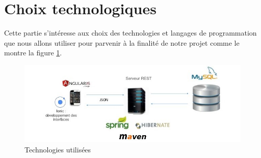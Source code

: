 \section{Choix technologiques}

\qquad Cette partie s'intéresse aux choix des technologies et langages de programmation que nous allons utiliser pour parvenir à la finalité de notre projet comme le montre la figure \ref{fig4.1}.

\begin{figure}[!h]
	\begin{center}
		\includegraphics[width=0.64\textheight]{figures/archi}
	\end{center}
	\caption{Technologies utilisées}
	\label{fig4.1}
\end{figure}
\newpage
